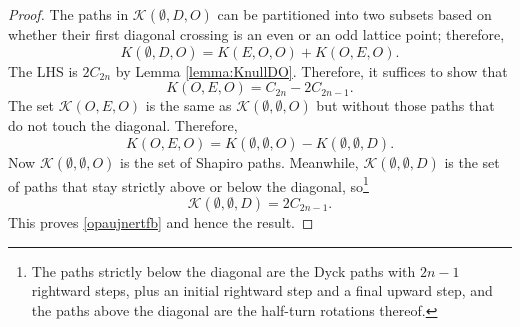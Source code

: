 \documentclass[10pt,a4paper]{amsart}
\newcommand{\eqn}[1]{\begin{equation*} #1 \end{equation*}}
\newcommand{\neqn}[1]{\begin{equation} #1 \end{equation}}
\begin{document}
\begin{proof}
The paths in $\mathcal{K}(\emptyset, D, O)$ can be partitioned into two subsets based on whether their first diagonal crossing is an even or an odd lattice point; therefore,
\eqn{K(\emptyset,D,O) = K(E,O,O) + K(O,E,O).}
The LHS is $2C_{2n}$ by Lemma \ref{lemma:KnullDO}. Therefore, it suffices to show that
\neqn{K(O,E,O) = C_{2n} - 2C_{2n-1}. \label{opaujnertfb}}
The set $\mathcal{K}(O,E,O)$ is the same as $\mathcal{K}(\emptyset,\emptyset,O)$ but without those paths that do not touch the diagonal. Therefore,
\eqn{K(O,E,O) = K(\emptyset,\emptyset,O) - K(\emptyset,\emptyset,D).}
Now $\mathcal{K}(\emptyset,\emptyset,O)$ is the set of Shapiro paths. Meanwhile, $\mathcal{K}(\emptyset,\emptyset,D)$ is the set of paths that stay strictly above or below the diagonal, so\footnote{The paths strictly below the diagonal are the Dyck paths with $2n-1$ rightward steps, plus an initial rightward step and a final upward step, and the paths above the diagonal are the half-turn rotations thereof.}
\neqn{\mathcal{K}(\emptyset,\emptyset,D)= 2C_{2n-1}. \label{non-diag}}
This proves \ref{opaujnertfb} and hence the result.
\end{proof}
\end{document}
